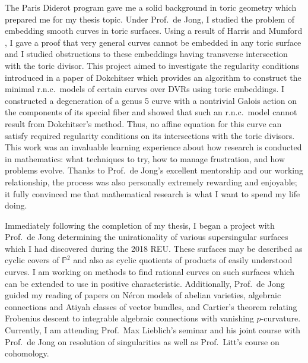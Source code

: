\documentclass[11pt]{article}
\begin{document}
\par
The Paris Diderot program gave me a solid background in toric geometry which prepared me for my thesis topic. Under Prof.\ de Jong, I studied the problem of embedding smooth curves in toric surfaces. Using a result of Harris and Mumford , I gave a proof that very general curves cannot be embedded in any toric surface and I studied obstructions to these embeddings having transverse intersection with the toric divisor. This project aimed to investigate the regularity conditions introduced in a paper of Dokchitser  which provides an algorithm to construct the minimal r.n.c.\ models of certain curves over DVRs using toric embeddings. I constructed a degeneration of a genus 5 curve with a nontrivial Galois action on the components of its special fiber and showed that such an r.n.c.\ model cannot result from Dokchitser's method. Thus, no affine equation for this curve can satisfy required regularity conditions on its intersections with the toric divisors. This work was an invaluable learning experience about how research is conducted in mathematics: what techniques to try, how to manage frustration, and how problems evolve. Thanks to Prof.\ de Jong’s excellent mentorship and our working relationship, the process was also personally extremely rewarding and enjoyable; it fully convinced me that mathematical research is what I want to spend my life doing. 
\par 
Immediately following the completion of my thesis, I began a project with Prof.\ de Jong determining the unirationality of various supersingular surfaces which I had discovered during the 2018 REU. These surfaces may be described as cyclic covers of $\mathbb{P}^2$ and also as cyclic quotients of products of easily understood curves. I am working on methods to find rational curves on such surfaces which can be extended to use in positive characteristic. Additionally, Prof.\ de Jong guided my reading of papers on N\'{e}ron models of abelian varieties, algebraic connections and Atiyah classes of vector bundles, and Cartier's theorem relating Frobenius descent to integrable algebraic connections with vanishing $p$-curvature. Currently, I am attending Prof.\ Max Lieblich's seminar and his joint course with Prof.\ de Jong on resolution of singularities as well as Prof.\ Litt's course on \etale cohomology.
\par
\end{document}
